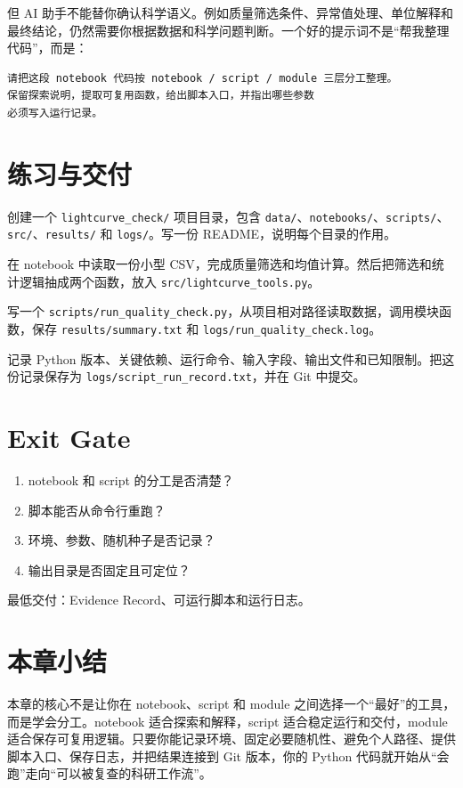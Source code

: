 但 AI 助手不能替你确认科学语义。例如质量筛选条件、异常值处理、单位解释和最终结论，仍然需要你根据数据和科学问题判断。一个好的提示词不是“帮我整理代码”，而是：

\begin{lstlisting}[style=terminal]
请把这段 notebook 代码按 notebook / script / module 三层分工整理。
保留探索说明，提取可复用函数，给出脚本入口，并指出哪些参数
必须写入运行记录。
\end{lstlisting}

\section{练习与交付}

\begin{exercisebox}[基础练习]
创建一个 \texttt{lightcurve\_check/} 项目目录，包含 \texttt{data/}、\texttt{notebooks/}、\texttt{scripts/}、\texttt{src/}、\texttt{results/} 和 \texttt{logs/}。写一份 README，说明每个目录的作用。
\end{exercisebox}

\begin{exercisebox}[过程练习]
在 notebook 中读取一份小型 CSV，完成质量筛选和均值计算。然后把筛选和统计逻辑抽成两个函数，放入 \texttt{src/lightcurve\_tools.py}。
\end{exercisebox}

\begin{exercisebox}[脚本练习]
写一个 \texttt{scripts/run\_quality\_check.py}，从项目相对路径读取数据，调用模块函数，保存 \texttt{results/summary.txt} 和 \texttt{logs/run\_quality\_check.log}。
\end{exercisebox}

\begin{exercisebox}[交付练习]
记录 Python 版本、关键依赖、运行命令、输入字段、输出文件和已知限制。把这份记录保存为 \texttt{logs/script\_run\_record.txt}，并在 Git 中提交。
\end{exercisebox}

\section{Exit Gate}

\begin{enumerate}
    \item notebook 和 script 的分工是否清楚？
    \item 脚本能否从命令行重跑？
    \item 环境、参数、随机种子是否记录？
    \item 输出目录是否固定且可定位？
\end{enumerate}

最低交付：Evidence Record、可运行脚本和运行日志。

\section{本章小结}

本章的核心不是让你在 notebook、script 和 module 之间选择一个“最好”的工具，而是学会分工。notebook 适合探索和解释，script 适合稳定运行和交付，module 适合保存可复用逻辑。只要你能记录环境、固定必要随机性、避免个人路径、提供脚本入口、保存日志，并把结果连接到 Git 版本，你的 Python 代码就开始从“会跑”走向“可以被复查的科研工作流”。
